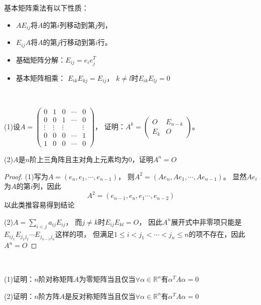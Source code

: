 \begin{theorem}[基本矩阵乘法]
  基本矩阵乘法有以下性质：
  \begin{itemize}
  \item 
    $AE_{ij}$将$A$的第$i$列移动到第$j$列，
  \item 
    $E_{ij}A$将$A$的第$j$行移动到第$i$行。
  \item 基础矩阵分解：$E_{ij} = e_ie^T_j$
  \item 基本矩阵相乘：
    $E_{ik}E_{kj} = E_{ij}$，
    $k \neq l$时$E_{ik}E_{lj} = 0$
  \end{itemize}
\end{theorem}

~

\begin{exercise}[用基础矩阵研究幂次]
  (1)设$A=\left(\begin{array}{ccccc}
              0 & 1 & 0 & \cdots & 0 \\
              0 & 0 & 1 & \cdots & 0 \\
              \vdots & \vdots & \vdots & & \vdots \\
              0 & 0 & 0 & \cdots & 1 \\
              1 & 0 & 0 & \cdots & 0
            \end{array}\right)$，
          证明：$A^k = \left(
            \begin{array}{cc}
              O&E_{n-k}\\
              E_k&O
            \end{array}
  \right)$。

  (2)$A$是$n$阶上三角阵且主对角上元素均为$0$，证明$A^n = O$
\end{exercise}

\begin{proof}
  (1)写为$A = (e_n,e_1,\cdots,e_{n-1})$，
  则$A^2 = (Ae_n,Ae_1,\cdots,Ae_{n-1})$。
  显然$Ae_i$为$A$的第$i$列，因此
  \begin{equation*}
    A^2 = (e_{n-1},e_n,e_1\cdots,e_{n-2})
  \end{equation*}
  以此类推容易得到结论

  (2)$A = \sum\limits_{i < j} a_{ij} E_{ij}$，
  而$j \neq k$时$E_{ij}E_{kl} = O$，
  因此$A^n$展开式中非零项只能是$E_{ij_1}E_{j_1j_2}\cdots E_{j_{n-1}j_n}$这样的项，
  但满足$1 \leq i < j_1 < \cdots < j_n \leq n$的项不存在，因此$A^n = O$
\end{proof}

~

\begin{exercise}[用二次型研究矩阵性质]
  (1)证明：$n$阶对称矩阵$A$为零矩阵当且仅当$\forall \alpha \in \mathbb{R}^n$有$\alpha^TA\alpha = 0$   

  (2)证明：$n$阶方阵$A$是反对称矩阵当且仅当$\forall \alpha \in \mathbb{R}^n$有$\alpha^T A \alpha = 0$
\end{exercise}

